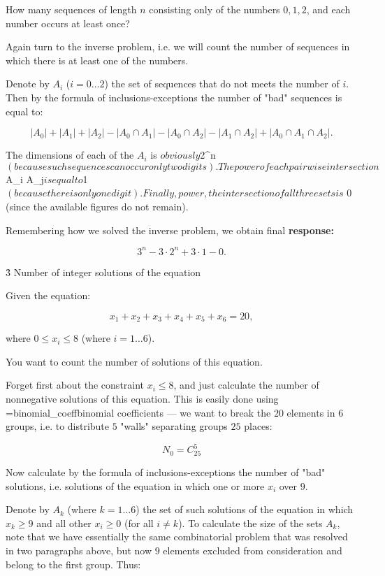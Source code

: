 How many sequences of length $n$ consisting only of the numbers $0,1,2$, and each number occurs at least once?

Again turn to the inverse problem, i.e. we will count the number of sequences in which there is at least one of the numbers.

Denote by $A_i$ ($i = 0 \ldots 2$) the set of sequences that do not meets the number of $i$. Then by the formula of inclusions-exceptions the number of "bad" sequences is equal to:

$$ |A_0| + |A_1| + |A_2| - |A_0 \cap A_1| - |A_0 \cap A_2| - |A_1 \cap A_2| + |A_0 \cap A_1 \cap A_2|. $$

The dimensions of each of the $A_i$ is $ obviously $2^n$ (because such sequences can occur only two digits). The power of each pairwise intersection $A_i \cap A_j$ is equal to $1$ (because there is only one digit). Finally, power, the intersection of all three sets is $ $0$ (since the available figures do not remain).

Remembering how we solved the inverse problem, we obtain final \bf{response}:

$$ 3^n - 3 \cdot 2^n + 3 \cdot 1 - 0. $$


\h3{ Number of integer solutions of the equation }

Given the equation:

$$ x_1 + x_2 + x_3 + x_4 + x_5 + x_6 = 20, $$

where $0 \le x_i \le 8$ (where $i = 1 \ldots 6$).

You want to count the number of solutions of this equation.

Forget first about the constraint $x_i \le 8$, and just calculate the number of nonnegative solutions of this equation. This is easily done using \algohref=binomial_coeff{binomial coefficients} --- we want to break the $20$ elements in $6$ groups, i.e. to distribute $5$ "walls" separating groups $25$ places:

$$ N_0 = C_{25}^5 $$

Now calculate by the formula of inclusions-exceptions the number of "bad" solutions, i.e. solutions of the equation in which one or more $x_i$ over $9$.

Denote by $A_k$ (where $k = 1 \ldots 6$) the set of such solutions of the equation in which $x_k \ge 9$ and all other $x_i \ge 0$ (for all $i \ne k$). To calculate the size of the sets $A_k$, note that we have essentially the same combinatorial problem that was resolved in two paragraphs above, but now $9$ elements excluded from consideration and belong to the first group. Thus:

